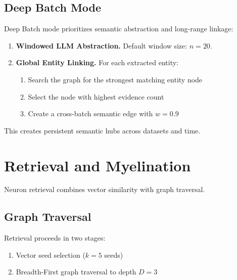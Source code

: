 \documentclass[11pt,a4paper]{article}
\begin{document}
\subsection{Deep Batch Mode}

Deep Batch mode prioritizes semantic abstraction and long-range linkage:

\begin{enumerate}
    \item \textbf{Windowed LLM Abstraction.}
          Default window size: $n = 20$.

    \item \textbf{Global Entity Linking.}
          For each extracted entity:
          \begin{enumerate}
              \item Search the graph for the strongest matching entity node
              \item Select the node with highest evidence count
              \item Create a cross-batch semantic edge with $w = 0.9$
          \end{enumerate}
\end{enumerate}

This creates persistent semantic hubs across datasets and time.

\section{Retrieval and Myelination}

Neuron retrieval combines vector similarity with graph traversal.

\subsection{Graph Traversal}

Retrieval proceeds in two stages:

\begin{enumerate}
    \item Vector seed selection ($k = 5$ seeds)
    \item Breadth-First graph traversal to depth $D = 3$
\end{enumerate}
\end{document}
